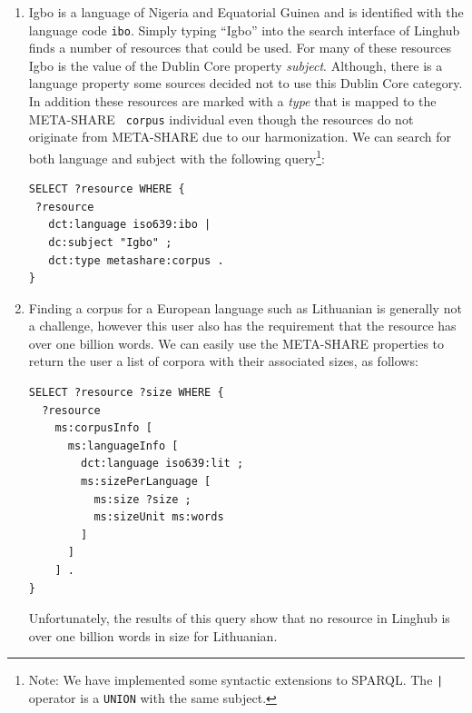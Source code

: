 \documentclass{acm_proc_article-sp}
\begin{document}
\begin{enumerate}

\item {}

Igbo is a language of Nigeria and Equatorial Guinea and is identified with the
language code {\tt ibo}. Simply typing ``Igbo'' into the search interface of
Linghub finds a number of resources that could be used. For many of these
resources Igbo is the value of the Dublin Core property \emph{subject}. Although, there is a language property
some sources decided not to use this Dublin Core category. In addition these
resources are marked with a \emph{type} that is mapped to the META-SHARE {\tt
corpus} individual even though the resources do not originate from META-SHARE
due to our harmonization. We can search for
both language and subject with the following query\footnote{Note: We have
    implemented some syntactic extensions to SPARQL. The \texttt{|} operator is
a \texttt{UNION} with the same subject.}:

\begin{verbatim}
SELECT ?resource WHERE {
 ?resource
   dct:language iso639:ibo |
   dc:subject "Igbo" ;
   dct:type metashare:corpus .
}
\end{verbatim}

\item {}

Finding a corpus for a European language such as Lithuanian is generally not a
challenge, however this user also has the requirement that the resource has over
one billion words. We can easily use the META-SHARE properties to return the
user a list of corpora with their associated sizes, as follows:

\begin{verbatim}
SELECT ?resource ?size WHERE {
  ?resource
    ms:corpusInfo [
      ms:languageInfo [
        dct:language iso639:lit ;
        ms:sizePerLanguage [
          ms:size ?size ;
          ms:sizeUnit ms:words
        ]
      ]
    ] .
}
\end{verbatim}

Unfortunately, the results of this query show that no resource in Linghub is
over one billion words in size for Lithuanian.
      

\end{enumerate}
\end{document}
